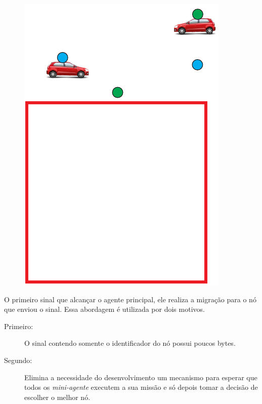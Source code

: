 \begin{figure}[htbp]
\begin{minipage}{0.33\textwidth}
	  \label{fig:destinoVeiculoSelecionadoDentroRA}
	\end{minipage}
	\begin{minipage}{0.33\textwidth}
	  \centering
	  \includegraphics[scale=0.5]{metodologia/figuras/destinoVeiculoSelecionadoProximoRA.pdf}
	  \label{fig:destinoVeiculoSelecionadoProximoRA}
	\end{minipage}
\end{figure}



O primeiro sinal que alcançar o agente principal, ele realiza a migração para o nó que enviou o sinal. Essa abordagem é utilizada por dois motivos.

\begin{description}
  \item[Primeiro:] O sinal contendo somente o identificador do nó possui poucos bytes.
  \item[Segundo:] Elimina a necessidade do desenvolvimento um mecanismo para esperar que todos os \emph{mini-agente} executem a sua missão e só depois tomar a decisão de escolher o melhor nó.
\end{description}

